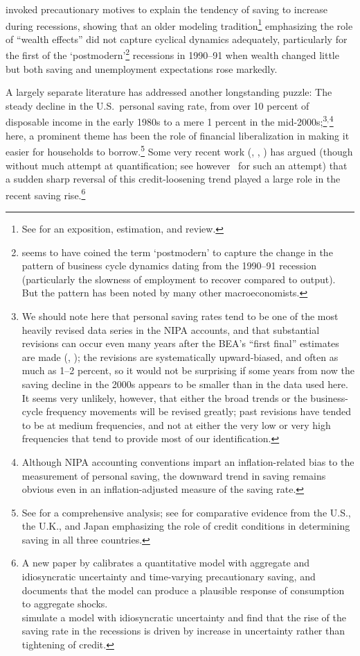 \documentclass[titlepage]{\econtex}
\begin{document}
\cite{carroll:brookings} invoked precautionary motives to explain the tendency of saving to increase during recessions, showing that an older modeling tradition\footnote{See \cite{davis&palumbo:wealtheffects} for an exposition, estimation, and review.}  emphasizing the role of ``wealth effects'' did not capture cyclical dynamics adequately, particularly for the first of the `postmodern'\footnote{\cite{krugmanPostmodern} seems to have coined the term `postmodern' to capture the change in the pattern of business cycle dynamics dating from the 1990--91 recession (particularly the slowness of employment to recover compared to output).  But the pattern has been noted by many other macroeconomists.} recessions in 1990--91 when wealth changed little but both saving and unemployment expectations rose markedly.

A largely separate literature has addressed another longstanding puzzle: The steady decline in the U.S.\ personal saving rate,
from over 10 percent of disposable income in the early 1980s to a mere
1 percent in the mid-2000s;\footnote{We should note here that personal saving rates tend to be one of the
most heavily revised data series in the NIPA accounts, and that substantial revisions can occur even many years after the BEA's ``first final'' estimates are made (\cite{nsSavingRevisions}, \cite{consumerGEP}); the revisions are systematically upward-biased, and often as much as 1--2 percent, so it would not be surprising if some years from now the saving decline in the 2000s appears to be smaller than in the data used here.  It seems very unlikely, however, that either the broad trends or the business-cycle frequency movements will be revised greatly; past revisions have tended to be at medium frequencies, and not at either the very low or very high frequencies that tend to provide most of our identification.}$^{,}$\footnote{
Although NIPA accounting
  conventions impart an inflation-related bias to the measurement of
  personal saving, the downward trend in saving remains obvious even
  in an inflation-adjusted measure of the saving rate.} here, a
prominent theme has been the role of financial liberalization in
making it easier for households to borrow.\footnote{See
\cite{parker_nberma_spendthrift} for a comprehensive
analysis; see \cite{admmmCredit} for comparative evidence from the U.S.,
  the U.K., and Japan emphasizing the role of credit conditions in determining saving in all three countries.} Some very recent work (\cite{glLiq}, \cite{gkLiq}, \cite{hall:slump})
has argued (though without much attempt at quantification; see however~\cite{hallQuantifying} for such an attempt) that a
sudden sharp reversal of this credit-loosening trend played a large
role in the recent saving rise.\footnote{A new paper by \cite{challe&ragot:precautionaryS}
calibrates a quantitative model with aggregate and idiosyncratic
uncertainty and time-varying precautionary saving, and documents
that the model can produce a plausible response of consumption to
aggregate shocks.
\\
\cite{alanCrossleyLow:rainyDay} simulate a model with idiosyncratic uncertainty and find that the rise of the saving rate in the recessions is driven by increase in uncertainty rather than tightening of credit.
}
\end{document}
